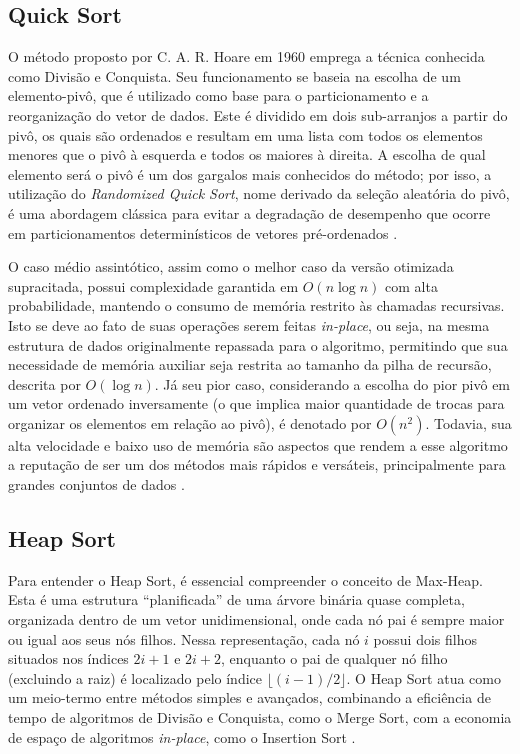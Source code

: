\documentclass[12pt,a4paper]{article}
\begin{document}
\subsection{Quick Sort}
O método proposto por C. A. R. Hoare em 1960 emprega a técnica conhecida como Divisão e Conquista. Seu funcionamento se baseia na escolha de um elemento-pivô, que é utilizado como base para o particionamento e a reorganização do vetor de dados. Este é dividido em dois sub-arranjos a partir do pivô, os quais são ordenados e resultam em uma lista com todos os elementos menores que o pivô à esquerda e todos os maiores à direita. A escolha de qual elemento será o pivô é um dos gargalos mais conhecidos do método; por isso, a utilização do \textit{Randomized Quick Sort}, nome derivado da seleção aleatória do pivô, é uma abordagem clássica para evitar a degradação de desempenho que ocorre em particionamentos determinísticos de vetores pré-ordenados \cite{cormen2012}.

O caso médio assintótico, assim como o melhor caso da versão otimizada supracitada, possui complexidade garantida em $O(n \log n)$ com alta probabilidade, mantendo o consumo de memória restrito às chamadas recursivas. Isto se deve ao fato de suas operações serem feitas \textit{in-place}, ou seja, na mesma estrutura de dados originalmente repassada para o algoritmo, permitindo que sua necessidade de memória auxiliar seja restrita ao tamanho da pilha de recursão, descrita por $O(\log n)$. 
Já seu pior caso, considerando a escolha do pior pivô em um vetor ordenado inversamente (o que implica maior quantidade de trocas para organizar os elementos em relação ao pivô), é denotado por $O(n^2)$. Todavia, sua alta velocidade e baixo uso de memória são aspectos que rendem a esse algoritmo a reputação de ser um dos métodos mais rápidos e versáteis, principalmente para grandes conjuntos de dados \cite{sedgewick2011}.

\subsection{Heap Sort}
Para entender o Heap Sort, é essencial compreender o conceito de Max-Heap. Esta é uma estrutura ``planificada'' de uma árvore binária quase completa, organizada dentro de um vetor unidimensional, onde cada nó pai é sempre maior ou igual aos seus nós filhos. Nessa representação, cada nó $i$ possui dois filhos situados nos índices $2i + 1$ e $2i + 2$, enquanto o pai de qualquer nó filho (excluindo a raiz) é localizado pelo índice $\lfloor (i - 1)/2 \rfloor$. O Heap Sort atua como um meio-termo entre métodos simples e avançados, combinando a eficiência de tempo de algoritmos de Divisão e Conquista, como o Merge Sort, com a economia de espaço de algoritmos \textit{in-place}, como o Insertion Sort \cite{cormen2012}.
\end{document}
